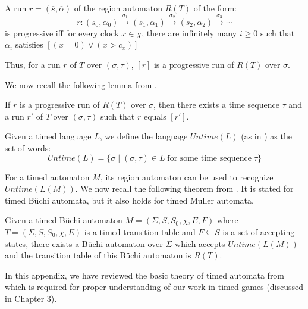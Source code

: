 \begin{definition}
A run $r = (\overline{s}, \overline{\alpha})$ of the region automaton $R(T)$ of the form:
\[r: (s_{0}, \alpha_{0}) \overset{\sigma_{1}}{\longrightarrow} (s_{1}, \alpha_{1}) \overset{\sigma_{2}}{\longrightarrow} (s_{2}, \alpha_{2}) \overset{\sigma_{3}}{\longrightarrow} \cdots \]
is progressive iff for every clock $x \in \chi$, there are infinitely many $i \geq 0$ such that $\alpha_{i}$ satisfies $[(x = 0) \vee (x > c_{x})]$
\end{definition}

Thus, for a run $r$ of $T$ over $(\sigma, \tau)$, $[r]$ is a progressive run of $R(T)$ over $\sigma$.

We now recall the following lemma from \cite{1}.

\begin{lemma}
If $r$ is a progressive run of $R(T)$ over $\sigma$, then there exists a time sequence $\tau$ and a run $r'$ of $T$ over $(\sigma, \tau)$ such that $r$ equals $[r']$.
\end{lemma}

Given a timed language $L$, we define the language $Untime(L)$ (as in \cite{1}) as the set of words:
\[Untime(L) = \lbrace \sigma \; \vert \; (\sigma, \tau) \in L \; \text{for some time sequence} \; \tau \rbrace\]

For a timed automaton $M$, its region automaton can be used to recognize $Untime(L(M))$. We now recall the following theorem from \cite{1}. It is stated for timed B{\"u}chi automata, but it also holds for timed Muller automata.

\begin{theorem}
Given a timed B{\"u}chi automaton $M = (\Sigma, S, S_{0}, \chi, E, F)$ where $T = (\Sigma, S, S_{0}, \chi, E)$ is a timed transition table and $F \subseteq S$ is a set of accepting states, there exists a B{\"u}chi automaton over $\Sigma$ which accepts $Untime(L(M))$ and the transition table of this B{\"u}chi automaton is $R(T)$.
\end{theorem}

In this appendix, we have reviewed the basic theory of timed automata from \cite{1} which is required for proper understanding of our work in timed games (discussed in Chapter 3).
